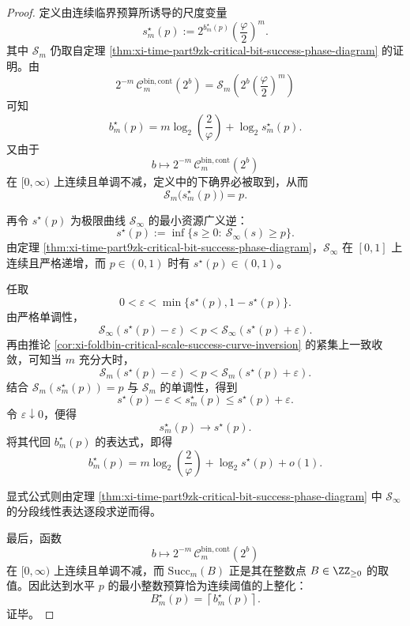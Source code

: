 \begin{proof}
定义由连续临界预算所诱导的尺度变量
\[
s_m^\star(p)
:=
2^{b_m^\star(p)}\left(\frac{\varphi}{2}\right)^m.
\]
其中 \(\mathcal S_m\) 仍取自定理
\ref{thm:xi-time-part9zk-critical-bit-success-phase-diagram}
的证明。由
\[
2^{-m}\,\mathcal C_m^{\mathrm{bin,cont}}(2^b)
=
\mathcal S_m\!\left(2^b\left(\frac{\varphi}{2}\right)^m\right)
\]
可知
\[
b_m^\star(p)
=
m\log_2\!\left(\frac{2}{\varphi}\right)
+
\log_2 s_m^\star(p).
\]
又由于
\[
b\longmapsto 2^{-m}\,\mathcal C_m^{\mathrm{bin,cont}}(2^b)
\]
在 \([0,\infty)\) 上连续且单调不减，定义中的下确界必被取到，从而
\[
\mathcal S_m\bigl(s_m^\star(p)\bigr)=p.
\]

再令 \(s^\star(p)\) 为极限曲线 \(\mathcal S_\infty\) 的最小资源广义逆：
\[
s^\star(p):=
\inf\{s\ge 0:\ \mathcal S_\infty(s)\ge p\}.
\]
由定理 \ref{thm:xi-time-part9zk-critical-bit-success-phase-diagram}，\(\mathcal S_\infty\) 在 \([0,1]\) 上连续且严格递增，而 \(p\in(0,1)\) 时有 \(s^\star(p)\in(0,1)\)。

任取
\[
0<\varepsilon<\min\{s^\star(p),1-s^\star(p)\}.
\]
由严格单调性，
\[
\mathcal S_\infty(s^\star(p)-\varepsilon)<p<\mathcal S_\infty(s^\star(p)+\varepsilon).
\]
再由推论 \ref{cor:xi-foldbin-critical-scale-success-curve-inversion} 的紧集上一致收敛，可知当 \(m\) 充分大时，
\[
\mathcal S_m(s^\star(p)-\varepsilon)<p<\mathcal S_m(s^\star(p)+\varepsilon).
\]
结合 \(\mathcal S_m(s_m^\star(p))=p\) 与 \(\mathcal S_m\) 的单调性，得到
\[
s^\star(p)-\varepsilon
<
s_m^\star(p)
\le
s^\star(p)+\varepsilon.
\]
令 \(\varepsilon\downarrow 0\)，便得
\[
s_m^\star(p)\longrightarrow s^\star(p).
\]
将其代回 \(b_m^\star(p)\) 的表达式，即得
\[
b_m^\star(p)
=
m\log_2\!\left(\frac{2}{\varphi}\right)
+
\log_2 s^\star(p)
+
o(1).
\]

显式公式则由定理 \ref{thm:xi-time-part9zk-critical-bit-success-phase-diagram} 中 \(\mathcal S_\infty\) 的分段线性表达逐段求逆而得。

最后，函数
\[
b\longmapsto 2^{-m}\,\mathcal C_m^{\mathrm{bin,cont}}(2^b)
\]
在 \([0,\infty)\) 上连续且单调不减，而 \(\mathrm{Succ}_m(B)\) 正是其在整数点 \(B\in\ZZ_{\ge 0}\) 的取值。因此达到水平 \(p\) 的最小整数预算恰为连续阈值的上整化：
\[
B_m^\star(p)=\left\lceil b_m^\star(p)\right\rceil.
\]
证毕。
\end{proof}

